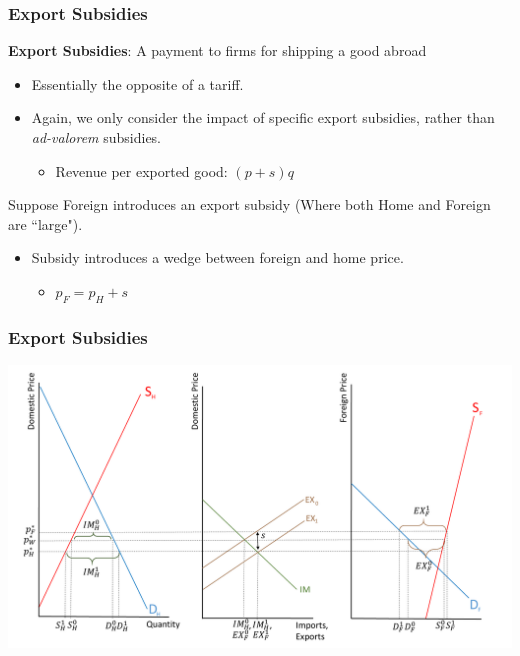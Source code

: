 \documentclass{beamer}
\begin{document}
\begin{frame}
	\frametitle{Export Subsidies}
	\textbf{Export Subsidies}: A payment to firms for shipping a good abroad
	\begin{itemize}
		\item Essentially the opposite of a tariff.
		\item Again, we only consider the impact of specific export subsidies, rather than \emph{ad-valorem} subsidies.
			\begin{itemize}
				\item Revenue per exported good: $(p+s)q$
			\end{itemize}
	\end{itemize}

Suppose Foreign introduces an export subsidy (Where both Home and Foreign are ``large").
		\begin{itemize}
			\item Subsidy introduces a wedge between foreign and home price.
				\begin{itemize}
					\item $p_F=p_H+s$
				\end{itemize}
		\end{itemize}
	
\end{frame}

\begin{frame}
	\frametitle{Export Subsidies}
	
	\includegraphics[scale=0.3]{SL_23.pdf}
	
\end{frame}
\end{document}
